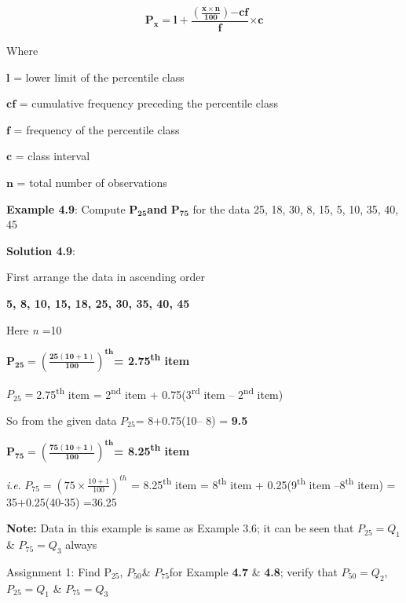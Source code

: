 \documentclass[
]{book}
\begin{document}
\[\mathbf{P}_{\mathbf{x}}\mathbf{= l +}\frac{\left( \frac{\mathbf{x \times n}}{\mathbf{100}} \right)\mathbf{- cf}}{\mathbf{f}}\mathbf{\times c}\]

Where

\(\mathbf{l}\) = lower limit of the percentile class

\(\mathbf{\text{cf}}\) = cumulative frequency preceding the percentile
class

\(\mathbf{f}\) = frequency of the percentile class

\(\mathbf{c}\) = class interval

\(\mathbf{n}\) = total number of observations

\textbf{Example 4.9}: Compute \(\mathbf{P}_{\mathbf{25}}\)\textbf{and}
\(\mathbf{P}_{\mathbf{75}}\) for the data 25, 18, 30, 8, 15, 5, 10, 35,
40, 45

\textbf{Solution 4.9}:

First arrange the data in ascending order

\textbf{5, 8, 10, 15, 18, 25, 30, 35, 40, 45}

Here \emph{n} =10

\(\mathbf{P}_{\mathbf{25}}\mathbf{=}\left( \frac{\mathbf{25}\left( \mathbf{10 + 1} \right)}{\mathbf{100}} \right)^{\mathbf{\text{th}}}\)\textbf{=
2.75\textsuperscript{th} item}

\(P_{25} =\)2.75\textsuperscript{th} item = 2\textsuperscript{nd} item + 0.75(3\textsuperscript{rd} item -- 2\textsuperscript{nd}
item)

So from the given data \(P_{25}\)= 8+0.75(10-- 8) = \textbf{9.5}

\(\mathbf{P}_{\mathbf{75}}\mathbf{=}\left( \frac{\mathbf{75}\left( \mathbf{10 + 1} \right)}{\mathbf{100}} \right)^{\mathbf{\text{th}}}\)\textbf{=
8.25\textsuperscript{th} item}

\emph{i}.\emph{e}. \(P_{75} = \left( 75 \times \frac{10 + 1}{100} \right)^{th}\) =
8.25\textsuperscript{th} item = 8\textsuperscript{th} item + 0.25(9\textsuperscript{th} item --8\textsuperscript{th} item) =
35+0.25(40-35) =36.25

\textbf{Note:} Data in this example is same as Example 3.6; it can be seen
that \(P_{25} = Q_{1}\) \& \(P_{75} = Q_{3}\) always

\begin{rmdnote}
Assignment 1: Find \(\text{P}_{25}\), \(P_{50}\)\& \(P_{75}\)for Example
\textbf{4.7} \& \textbf{4.8}; verify that \(P_{50} = Q_{2}\), \(P_{25} = Q_{1}\) \&
\(P_{75} = Q_{3}\)
\end{rmdnote}
\end{document}
